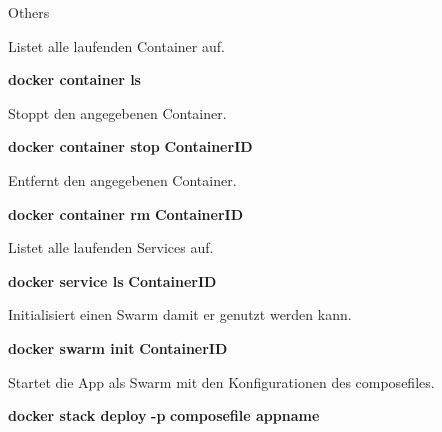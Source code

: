 \documentclass[final]{beamer}
\newlength{\sepwid}
\newlength{\onecolwid}
\newlength{\specialcolwid}
\begin{document}
\begin{frame}
\begin{columns}[t]
\begin{column}{\specialcolwid}
\begin{block}{Others}

\par Listet alle laufenden Container auf.
\par \textbf{docker container ls}

\vspace{1cm}
\par Stoppt den angegebenen Container.
\par \par \textbf{docker container stop} \textcolor{docker-lb}{\textbf{ContainerID}}

\vspace{1cm}
\par Entfernt den angegebenen Container.
\par \par \textbf{docker container rm} \textcolor{docker-lb}{\textbf{ContainerID}}

\vspace{1cm}
\par Listet alle laufenden Services auf.
\par \par \textbf{docker service ls} \textcolor{docker-lb}{\textbf{ContainerID}}

\vspace{1cm}
\par Initialisiert einen Swarm damit er genutzt werden kann.
\par \par \textbf{docker swarm init} \textcolor{docker-lb}{\textbf{ContainerID}}

\vspace{1cm}
\par Startet die App als Swarm mit den Konfigurationen des composefiles.
\par \par \textbf{docker stack deploy} \textcolor{docker-pu}{\textbf{-p}} \textcolor{docker-lb}{\textbf{composefile appname}}

\end{block}

\end{column} %

\begin{column}{\sepwid}\end{column} %

\begin{column}{\onecolwid} %


\end{column}
\end{columns}
\end{frame}
\end{document}
